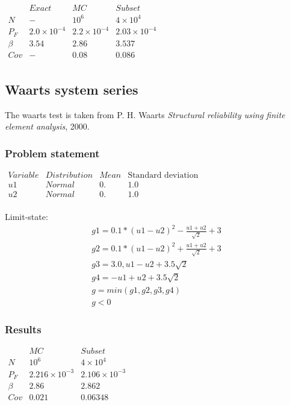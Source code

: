 $
\begin{array}{cccc}
            & Exact & MC & Subset \\
\hline
N & - & 10^6   & 4 \times 10^4 \\
P_F & 2.0\times10^{-4} & 2.2 \times10^{-4}  & 2.03 \times10^{-4}\\
\beta & 3.54 & 2.86  & 3.537 \\
Cov & - & 0.08  & 0.086 \\
\end{array}
$



\newpage
\subsection{Waarts system series}

The waarts test is taken from P. H. Waarts \textit{Structural reliability using finite element analysis}, 2000.

\subsubsection{Problem statement}

$
\begin{array}{lrrr}
Variable & Distribution & Mean & \text{Standard deviation} \\
\hline
u1 & Normal   & 0. & 1.0 \\
u2 & Normal   & 0. & 1.0 \\
\end{array}
$
\vspace{10mm}

Limit-state:\\
\begin{eqnarray*}
  g1 = 0.1 * (u1 - u2)^2 - \frac{u1 + u2}{\sqrt{2}} + 3\\
  g2 = 0.1 * (u1 - u2)^2 + \frac{u1 + u2}{\sqrt{2}} + 3\\
  g3 = 3.0, u1 - u2 + 3.5 \sqrt{2}\\
  g4 = -u1 + u2 + 3.5 \sqrt{2}\\
  g = min(g1, g2, g3, g4)\\
  g < 0
\end{eqnarray*}


\subsubsection{Results}

$
\begin{array}{ccc}
            & MC & Subset \\
\hline
N & 10^6   & 4\times 10^4 \\
P_F & 2.216 \times10^{-3}  & 2.106 \times10^{-3} \\
\beta & 2.86 & 2.862 \\
Cov & 0.021  & 0.06348 \\
\end{array}
$

